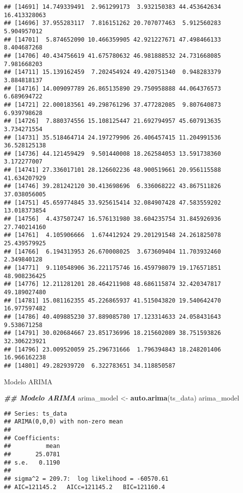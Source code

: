 \documentclass[
]{article}
\newenvironment{Shaded}{\begin{snugshade}}{\end{snugshade}}
\newcommand{\DocumentationTok}[1]{\textcolor[rgb]{0.56,0.35,0.01}{\textbf{\textit{#1}}}}
\newcommand{\FunctionTok}[1]{\textcolor[rgb]{0.13,0.29,0.53}{\textbf{#1}}}
\newcommand{\NormalTok}[1]{#1}
\newcommand{\OtherTok}[1]{\textcolor[rgb]{0.56,0.35,0.01}{#1}}
\begin{document}
\begin{verbatim}
## [14691] 14.749339491  2.961299173  3.932150383 44.453642634 16.413328063
## [14696] 37.955283117  7.816151262 20.707077463  5.912560283  5.904957012
## [14701]  5.874652090 10.466359905 42.921227671 47.498466133  8.404687268
## [14706] 40.434756619 41.675780632 46.981888532 24.731668085  7.981668203
## [14711] 15.139162459  7.202454924 49.420751340  0.948283379  3.884818137
## [14716] 14.009097789 26.865135890 29.750958888 44.064376573  6.689694722
## [14721] 22.000183561 49.298761296 37.477282085  9.807640873  6.939798628
## [14726]  7.880374556 15.108125447 21.692794957 45.607913635  3.734271554
## [14731] 35.518464714 24.197279906 26.406457415 11.204991536 36.528125138
## [14736] 44.121459429  9.501440008 18.262584053 13.591738360  3.172277007
## [14741] 27.336017101 28.126602236 48.900519661 20.956115588 41.634207929
## [14746] 39.281242120 30.413698696  6.336068222 43.867511826 37.038056005
## [14751] 45.659774845 33.925615414 32.084907428 47.583559202 13.018373854
## [14756]  4.437507247 16.576131980 38.604235754 31.845926936 27.740214160
## [14761]  4.105906666  1.674412924 29.201291548 24.261825078 25.439579925
## [14766]  6.194313953 26.670008025  3.673609404 11.703932460  2.349840128
## [14771]  9.110548906 36.221175746 16.459798079 19.176571851 48.908236425
## [14776] 12.211281201 28.464211908 48.686115874 32.420347817 49.189027480
## [14781] 15.081162355 45.226865937 41.515043820 19.540642470 16.977597482
## [14786] 40.409885230 37.889085780 17.123314633 24.058431643  9.538671258
## [14791] 30.020684667 23.851736996 18.215602089 38.751593826 32.306223921
## [14796] 23.009520059 25.296731666  1.796394843 18.248201406 16.966162238
## [14801] 49.282939720  6.322783651 34.118850587
\end{verbatim}

Modelo ARIMA

\begin{Shaded}
\begin{Highlighting}[]
\DocumentationTok{\#\# Modelo ARIMA}
\NormalTok{arima\_model }\OtherTok{\textless{}{-}} \FunctionTok{auto.arima}\NormalTok{(ts\_data)}
\NormalTok{arima\_model}
\end{Highlighting}
\end{Shaded}

\begin{verbatim}
## Series: ts_data 
## ARIMA(0,0,0) with non-zero mean 
## 
## Coefficients:
##          mean
##       25.0781
## s.e.   0.1190
## 
## sigma^2 = 209.7:  log likelihood = -60570.61
## AIC=121145.2   AICc=121145.2   BIC=121160.4
\end{verbatim}
\end{document}
